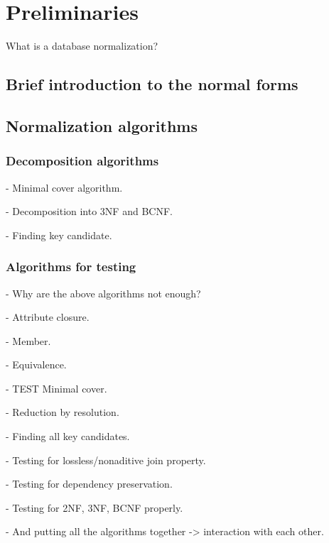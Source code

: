 \chapter{Preliminaries}
\label{chap:preliminaries}
What is a database normalization?
\section{Brief introduction to the normal forms}
\label{sec:nfintro}
\section{Normalization algorithms}

\subsection{Decomposition algorithms}

- Minimal cover algorithm.

- Decomposition into 3NF and BCNF.

- Finding key candidate.

\subsection{Algorithms for testing}

- Why are the above algorithms not enough?

- Attribute closure.

- Member.

- Equivalence.

- TEST Minimal cover.

- Reduction by resolution.

- Finding all key candidates.

- Testing for lossless/nonaditive join property.

- Testing for dependency preservation. 

- Testing for 2NF, 3NF, BCNF properly.

- And putting all the algorithms together -> interaction with each other.

